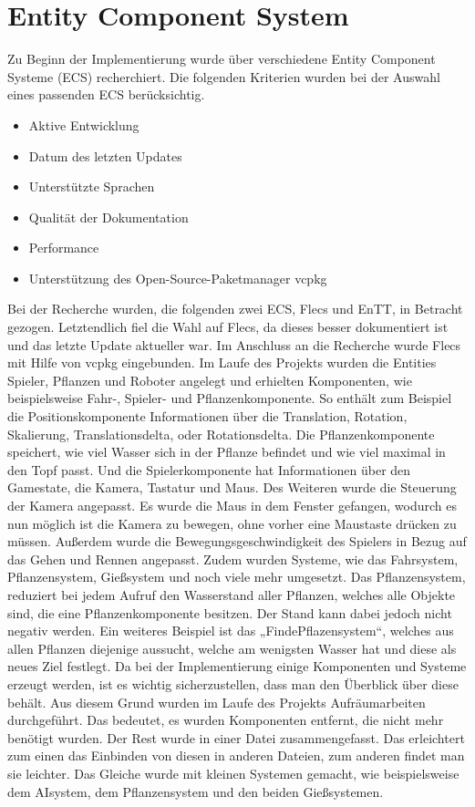 
\section{Entity Component System}
Zu Beginn der Implementierung wurde über verschiedene Entity Component Systeme (ECS) recherchiert. Die folgenden Kriterien wurden bei der Auswahl eines passenden ECS berücksichtig. 
\begin{itemize}
	\item Aktive Entwicklung
	\item Datum des letzten Updates
	\item Unterstützte Sprachen
	\item Qualität der Dokumentation
	\item Performance
	\item Unterstützung des Open-Source-Paketmanager vcpkg
\end{itemize}
Bei der Recherche wurden, die folgenden zwei ECS, Flecs und EnTT, in Betracht gezogen. Letztendlich fiel die Wahl auf Flecs, da dieses besser dokumentiert ist und das letzte Update aktueller war. 
Im Anschluss an die Recherche wurde Flecs mit Hilfe von vcpkg eingebunden. Im Laufe des Projekts wurden die Entities Spieler, Pflanzen und Roboter angelegt und erhielten Komponenten, wie beispielsweise Fahr-, Spieler- und Pflanzenkomponente. So enthält zum Beispiel die Positionskomponente Informationen über die Translation, Rotation, Skalierung, Translationsdelta, oder Rotationsdelta. Die Pflanzenkomponente speichert, wie viel Wasser sich in der Pflanze befindet und wie viel maximal in den Topf passt. Und die Spielerkomponente hat Informationen über den Gamestate, die Kamera, Tastatur und Maus. Des Weiteren wurde die Steuerung der Kamera angepasst. Es wurde die Maus in dem Fenster gefangen, wodurch es nun möglich ist die Kamera zu bewegen, ohne vorher eine Maustaste drücken zu müssen. Außerdem wurde die Bewegungsgeschwindigkeit des Spielers in Bezug auf das Gehen und Rennen angepasst.
Zudem wurden Systeme, wie das Fahrsystem, Pflanzensystem, Gießsystem und noch viele mehr umgesetzt. Das Pflanzensystem, reduziert bei jedem Aufruf den Wasserstand aller Pflanzen, welches alle Objekte sind, die eine Pflanzenkomponente besitzen. Der Stand kann dabei jedoch nicht negativ werden. Ein weiteres Beispiel ist das „FindePflazensystem“, welches aus allen Pflanzen diejenige aussucht, welche am wenigsten Wasser hat und diese als neues Ziel festlegt. 
Da bei der Implementierung einige Komponenten und Systeme erzeugt werden, ist es wichtig sicherzustellen, dass man den Überblick über diese behält. Aus diesem Grund wurden im Laufe des Projekts Aufräumarbeiten durchgeführt. Das bedeutet, es wurden Komponenten entfernt, die nicht mehr benötigt wurden. Der Rest wurde in einer Datei zusammengefasst. Das erleichtert zum einen das Einbinden von diesen in anderen Dateien, zum anderen findet man sie leichter. Das Gleiche wurde mit kleinen Systemen gemacht, wie beispielsweise dem AIsystem, dem Pflanzensystem und den beiden Gießsystemen.  

